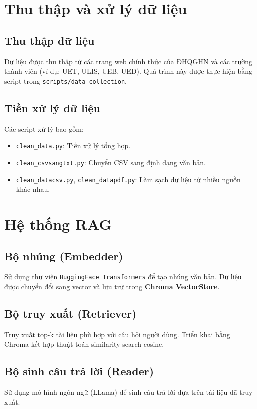 \documentclass[12pt]{article}
\begin{document}
\section{Thu thập và xử lý dữ liệu}
\subsection{Thu thập dữ liệu}
Dữ liệu được thu thập từ các trang web chính thức của ĐHQGHN và các trường thành viên (ví dụ: UET, ULIS, UEB, UED). Quá trình này được thực hiện bằng script trong \texttt{scripts/data\_collection}.

\subsection{Tiền xử lý dữ liệu}
Các script xử lý bao gồm:
\begin{itemize}
    \item \texttt{clean\_data.py}: Tiền xử lý tổng hợp.
    \item \texttt{clean\_csvsangtxt.py}: Chuyển CSV sang định dạng văn bản.
    \item \texttt{clean\_datacsv.py}, \texttt{clean\_datapdf.py}: Làm sạch dữ liệu từ nhiều nguồn khác nhau.
\end{itemize}

\section{Hệ thống RAG}
\subsection{Bộ nhúng (Embedder)}
Sử dụng thư viện \texttt{HuggingFace Transformers} để tạo nhúng văn bản. Dữ liệu được chuyển đổi sang vector và lưu trữ trong \textbf{Chroma VectorStore}.

\subsection{Bộ truy xuất (Retriever)}
Truy xuất top-k tài liệu phù hợp với câu hỏi người dùng. Triển khai bằng Chroma kết hợp thuật toán similarity search cosine.

\subsection{Bộ sinh câu trả lời (Reader)}
Sử dụng mô hình ngôn ngữ (LLama) để sinh câu trả lời dựa trên tài liệu đã truy xuất.
\end{document}
